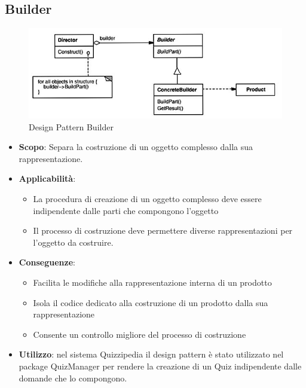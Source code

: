\documentclass[a4paper,11pt]{article}
\begin{document}
	\subsection{Builder}
	\begin{figure}[h!]
	\begin{center}
		\includegraphics[scale=1]{../images/Builder.png}
		\caption{Design Pattern Builder}
	\end{center}
	\end{figure}
	\begin{itemize}
		\item\textbf{Scopo}: Separa la costruzione di un oggetto complesso dalla sua rappresentazione.
		\item\textbf{Applicabilità}:
		\begin{itemize}
			\item La procedura di creazione di un oggetto complesso
deve essere indipendente dalle parti che
compongono l'oggetto
			\item Il processo di costruzione deve permettere diverse
rappresentazioni per l'oggetto da costruire.
		\end{itemize}
		\item\textbf{Conseguenze}:
		\begin{itemize}
			\item Facilita le modifiche alla rappresentazione interna di
un prodotto
			\item Isola il codice dedicato alla costruzione di un prodotto
dalla sua rappresentazione
			\item Consente un controllo migliore del processo di
costruzione
		\end{itemize}
		\item\textbf{Utilizzo}: nel sistema Quizzipedia il design pattern è stato utilizzato nel package QuizManager per rendere la creazione di un Quiz indipendente dalle domande che lo compongono.
	\end{itemize}
	\newpage
	
\end{document}
